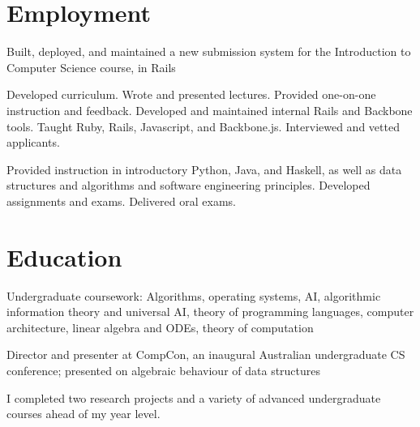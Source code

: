 \documentclass[letterpaper]{resume}
\begin{document}
\author{Buck Shlegeris}
\maketitle

\section{Employment}

\begin{compactitem}
\item Built, deployed, and maintained a new submission system for the Introduction to Computer Science course, in Rails
\end{compactitem}


\begin{compactitem}
\item Developed curriculum. Wrote and presented lectures. Provided one-on-one instruction and feedback. Developed and maintained internal Rails and Backbone tools. Taught Ruby, Rails, Javascript, and Backbone.js. Interviewed and vetted applicants.

\end{compactitem}


\begin{compactitem}
\item Provided instruction in introductory Python, Java, and Haskell, as well as data structures and algorithms and software engineering principles. Developed assignments and exams. Delivered oral exams.
\end{compactitem}


\section{Education}


\begin{compactitem}
\item Undergraduate coursework: Algorithms, operating systems, AI, algorithmic information theory and universal AI, theory of programming languages, computer architecture, linear algebra and ODEs, theory of computation
\item Director and presenter at CompCon, an inaugural Australian undergraduate CS conference; presented on algebraic behaviour of data structures
\item I completed two research projects and a variety of advanced undergraduate courses ahead of my year level.
\end{compactitem}
\end{document}

